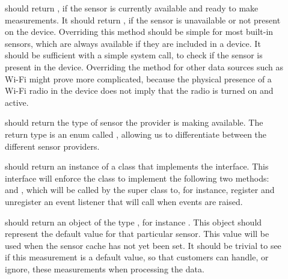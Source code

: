 \begin{description}
	\item[] should return , if the sensor is currently available and ready to make measurements. It should return , if the sensor is unavailable or not present on the device. Overriding this method should be simple for most built-in sensors, which are always available if they are included in a device. It should be sufficient with a simple system call, to check if the sensor is present in the device. Overriding the method for other data sources such as Wi-Fi might prove more complicated, because the physical presence of a Wi-Fi radio in the device does not imply that the radio is turned on and active.

	\item[] should return the type of sensor the provider is making available. The return type is an enum called , allowing us to differentiate between the different sensor providers.

	\item[] should return an instance of a class that implements the  interface. This interface will enforce the class to implement the following two methods:  and , which will be called by the super class to, for instance, register and unregister an event listener that will call  when events are raised.

  \item[] should return an object of the type , for instance . This object should represent the default value for that particular sensor. This value will be used when the sensor cache has not yet been set. It should be trivial to see if this measurement is a default value, so that customers can handle, or ignore, these measurements when processing the data.
\end{description} 



